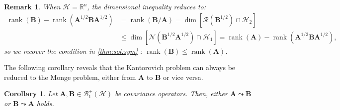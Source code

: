 \documentclass[noinfoline]{imsart}\setcounter{tocdepth}{2}
\renewcommand{\b}[1]{\mathbb{#1}} %
\newcommand{\m}[1]{\mathbf{#1}} %
\renewcommand{\c}[1]{\mathcal{#1}} %
\DeclareMathOperator*{\rk}{rank}
\theoremstyle{plain}
\newtheorem{corollary}[theorem]{Corollary}
\newtheorem{remark}{Remark}[section]
\begin{document}
\begin{remark}
When $\c{H} = \b{R}^{n}$, the dimensional inequality reduces to:
\begin{align*}
    \rk(\m{B}) - \rk(\m{A}^{1/2} \m{B} \m{A}^{1/2}) &= \rk(\m{B}/\m{A}) = \dim [\c{R}(\m{B}^{1/2}) \cap \c{H}_{2}] \\
    &\le \dim [\c{N}(\m{B}^{1/2} \m{A}^{1/2}) \cap \c{H}_{1}] = \rk(\m{A}) - \rk(\m{A}^{1/2} \m{B} \m{A}^{1/2}), 
\end{align*}
so we recover the condition in \cref{thm:sol:sym} : $\rk(\m{B}) \le \rk(\m{A})$.
\end{remark}

The following corollary reveals that the Kantorovich problem can always be reduced to the Monge problem, either from $\m{A}$ to $\m{B}$ or vice versa.

\begin{corollary}\label{cor:reach:connect}
Let $\m{A}, \m{B} \in \c{B}_{1}^{+}(\c{H})$ be covariance operators.
Then, either $\m{A} \leadsto \m{B}$ or $\m{B} \leadsto \m{A}$ holds.
\end{corollary}
\end{document}
